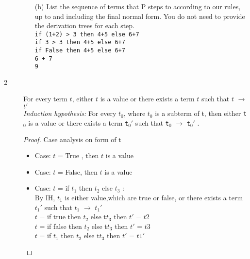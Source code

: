 \documentclass{article}
\begin{document}
\begin{description}
\begin{enumerate}
                \item[(b)]{List the sequence of terms that P steps to according to our rules, up to and including the final normal form.
                You do not need to provide the derivation trees for each step.
                }
                    \\
                    \verb|if (1+2) > 3 then 4+5 else 6+7| \\
                    \verb|if 3 > 3 then 4+5 else 6+7| \\
                    \verb|if False then 4+5 else 6+7| \\
                    \verb|6 + 7| \\
                    \verb|9| \\
            \end{enumerate}
        \item[2] {For every term $t$, either $t$ is a value or there exists a term $t$ such that $t$ $\rightarrow$ $t'$}\\
                \textit{Induction hypothesis:} For every $t_0$, where $t_0$ is a subterm of t, then  either \verb|t|$_0$ is a value or there exists a term \verb|t|$_0'$  such that \verb|t|$_0$  $\rightarrow$ \verb|t|$_0'$ .
                \begin{proof}
                    Case analysis on form of t
                    \begin{itemize}
                        \item Case: $t$ = True , then $t$ is a value
                        \item Case: $t$ = False, then $t$ is a value
                        \item Case: $t$ = if $t_1$ then $t_2$ else $t_3$ :\\
                                By IH, $t_1$ is either value,which are true or false, or there exists a term $t_1'$  such that $t_1$  $\rightarrow$ $t_1'$ \\
                                $t$ = if true then $t_2$ else t$t_3$ then $t'$ = $t2$ \\
                                $t$ = if false then $t_2$ else t$t_3$ then $t'$ = $t3$ \\
                                $t$ = if $t_1$ then $t_2$ else t$t_3$ then $t'$ = $t1'$ \\

                    \end{itemize}
                \end{proof}

    \end{description}
\end{document}
